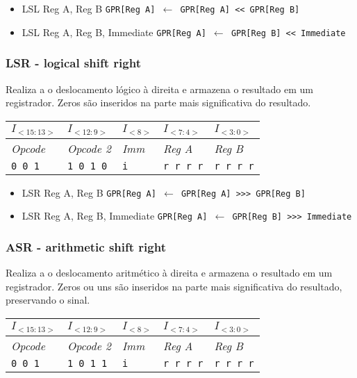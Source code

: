 \documentclass[11pt,a4paper]{report}
\begin{document}
\begin{itemize}
\item LSL Reg A, Reg B
\subitem \texttt{GPR[Reg A] $\leftarrow$ GPR[Reg A] << GPR[Reg B]}
\item LSL Reg A, Reg B, Immediate
\subitem \texttt{GPR[Reg A] $\leftarrow$ GPR[Reg B] << Immediate}
\end{itemize}

\subsubsection{LSR - logical shift right}

Realiza a o deslocamento lógico à direita e armazena o resultado em um
registrador. Zeros são inseridos na parte mais significativa do resultado.

\begin{table}[htb!]
\centering
\begin{tabular}{|p{2cm}|p{2cm}|p{2cm}|p{2cm}|p{2cm}|}
\hline
$I_{<15:13>}$ & $I_{<12:9>}$ & $I_{<8>}$ & $I_{<7:4>}$ & $I_{<3:0>}$  \\ \hline
\textit{Opcode} & \textit{Opcode 2} & \textit{Imm} & \textit{Reg A} & \textit{Reg B} \\ \hline
\texttt{0 0 1} & \texttt{1 0 1 0} & \texttt{i} & \texttt{r r r r} & \texttt{r r r r} \\ \hline
\end{tabular}
\end{table}

\begin{itemize}
\item LSR Reg A, Reg B
\subitem \texttt{GPR[Reg A] $\leftarrow$ GPR[Reg A] >>> GPR[Reg B]}
\item LSR Reg A, Reg B, Immediate
\subitem \texttt{GPR[Reg A] $\leftarrow$ GPR[Reg B] >>> Immediate}
\end{itemize}

\subsubsection{ASR - arithmetic shift right}

Realiza a o deslocamento aritmético à direita e armazena o resultado em
um registrador. Zeros ou uns são inseridos na parte mais significativa
do resultado, preservando o sinal.

\begin{table}[htb!]
\centering
\begin{tabular}{|p{2cm}|p{2cm}|p{2cm}|p{2cm}|p{2cm}|}
\hline
$I_{<15:13>}$ & $I_{<12:9>}$ & $I_{<8>}$ & $I_{<7:4>}$ & $I_{<3:0>}$  \\ \hline
\textit{Opcode} & \textit{Opcode 2} & \textit{Imm} & \textit{Reg A} & \textit{Reg B} \\ \hline
\texttt{0 0 1} & \texttt{1 0 1 1} & \texttt{i} & \texttt{r r r r} & \texttt{r r r r} \\ \hline
\end{tabular}
\end{table}
\end{document}
